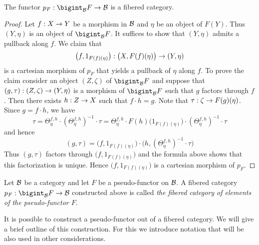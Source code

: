 \begin{fact}
The functor $p_F:\bigint_{\cB}F\ra \cB$ is a fibered category.
\end{fact}
\begin{proof}
Let $f:X\rightarrow Y$ be a morphism in ${\mathcal B}$ and $\eta$ be an object of $F(Y)$. Thus $(Y,\eta)$ is an object of $\bigint_{\cB}F$. It suffices to show that $(Y,\eta)$ admits a pullback along $f$. We claim that
$$\big(f,1_{F(f)(\eta)}\big):\big(X,F(f)(\eta)\big)\rightarrow (Y,\eta)$$
is a cartesian morphism of $p_F$ that yields a pullback of $\eta$ along $f$. To prove the claim consider an object $(Z,\zeta)$ of $\bigint_{\cB}F$ and suppose that $(g,\tau):(Z,\zeta)\rightarrow (Y,\eta)$ is a morphism of $\bigint_{\cB}F$ such that $g$ factors through $f$. Then there exists $h:Z\rightarrow X$ such that $f\cdot h = g$. Note that $\tau:\zeta\rightarrow F(g)(\eta)$. Since $g = f\cdot h$, we have
$$\tau = \Theta^{f,h}_{\eta}\cdot \left(\Theta^{f,h}_{\eta}\right)^{-1}\cdot \tau = \Theta^{f,h}_{\eta}\cdot F(h)\big(1_{F(f)(\eta)}\big) \cdot  \left(\Theta^{f,h}_{\eta}\right)^{-1}\cdot \tau$$
and hence
$$(g,\tau) = \big(f, 1_{F(f)(\eta)} \big) \cdot \bigg(h,\left(\Theta^{f,h}_{\eta}\right)^{-1}\cdot \tau \bigg)$$
Thus $(g,\tau)$ factors through $\big(f,1_{F(f)(\eta)}\big)$ and the formula above shows that this factorization is unique. Hence $\big(f,1_{F(f)(\eta)}\big)$ is a cartesian morphism of $p_F$.
\end{proof}

\begin{definition}
Let ${\mathcal B}$ be a category and let $F$ be a pseudo-functor on ${\mathcal B}$. A fibered category $p_F:\bigint_{\cB}F\ra \cB$ constructed above is called \textit{the fibered category of elements of the pseudo-functor $F$}.
\end{definition}
\noindent
It is possible to construct a pseudo-functor out of a fibered category. We will give a brief outline of this construction. For this we introduce notation that will be also used in other considerations.

